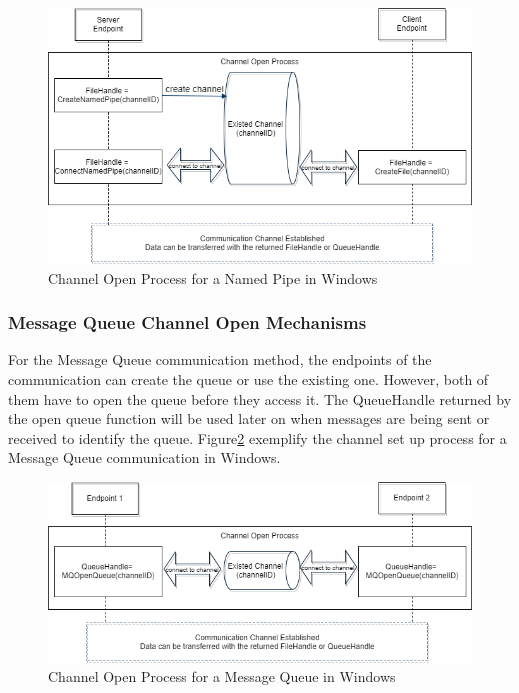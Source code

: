 \begin{figure}[H]
\centerline{\includegraphics[scale=0.55]{Figures/namepipechannelopen}}
 \caption{Channel Open Process for a Named Pipe in Windows}
\label{namedpipeopen}
\end{figure}
    
\subsubsection{Message Queue Channel Open Mechanisms} 
For the Message Queue communication method, the endpoints of the communication can create the queue or use the existing one. However, both of them have to open the queue before they access it. The QueueHandle returned by the open queue function will be used later on when messages are being sent or received to identify the queue. Figure\ref{msmqopen} exemplify the channel set up process for a Message Queue communication in Windows.
\begin{figure}[H]
\centerline{\includegraphics[scale=0.55]{Figures/msmqchannelopen}}
 \caption{Channel Open Process for a Message Queue in Windows}
\label{msmqopen}
\end{figure}

